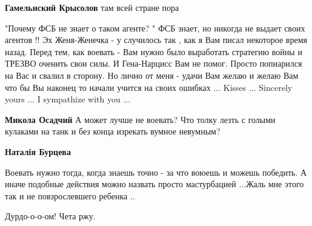 \begin{itemize}
\begin{itemize}
\textbf{Гамельнский Крысолов} там всей стране пора

 

"Почему ФСБ не знает о таком агенте? " ФСБ знает, но никогда не выдает своих
агентов !! Эх Женя-Женечка - у случилось так , как я Вам писал некоторое время
назад. Перед тем, как воевать - Вам нужно было выработать стратегию войны и
ТРЕЗВО оченить свои силы. И Гена-Нарцисс Вам не помог. Просто попиарился на Вас
и свалил в сторону. Но лично от меня - удачи Вам желаю и желаю Вам что бы Вы
наконец то начали учится на своих ошибках ... Kisses ... Sincerely yours ... I
sympathize with you ...


 
\textbf{Микола Осадчий} А может лучше не воевать? Что толку лезть с голыми кулаками на танк и без конца изрекать вумное невумным?

 
\textbf{Наталія Бурцева} 

Воевать нужно тогда, когда знаешь точно - за что воюешь и можешь победить. А
иначе подобные действия можно назвать просто мастурбацией ...Жаль мне этого так
и не повзрослевшего ребенка ..

\end{itemize}

 
Дурдо-о-о-ом! Чета ржу.

\end{itemize}


